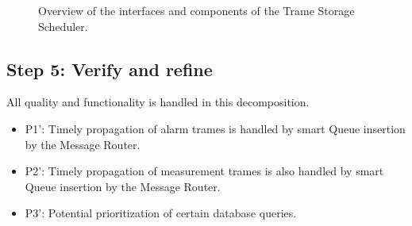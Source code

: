\begin{figure}[H]
	\begin{centering}
		\caption{Overview of the interfaces and components of the Trame Storage
		Scheduler.}
		\label{fig:it3/interfaces}
	\end{centering}
\end{figure}

\subsection{Step 5: Verify and refine}
\label{add:it3/verification}


\npar All quality and functionality is handled in this decomposition.  

\begin{itemize}
	\item P1': Timely propagation of alarm trames is handled by smart Queue
	insertion by the Message Router. 
	\item P2': Timely propagation of measurement trames is also handled by smart
	Queue insertion by the Message Router. 
	\item P3': Potential prioritization of certain database queries. 
\end{itemize}
